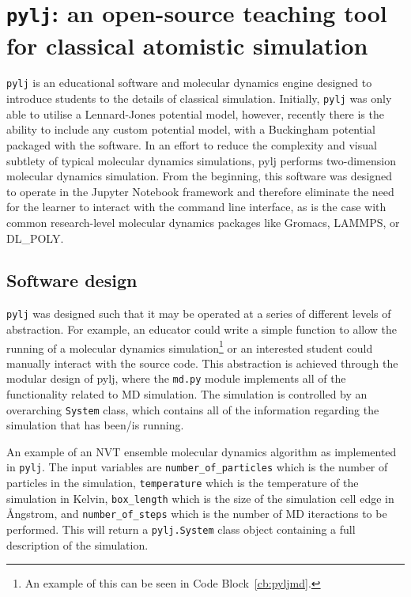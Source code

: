 \section{\texttt{pylj}: an open-source teaching tool for classical atomistic simulation}

\texttt{pylj}\autocite[PYthon Lennard-Jones]{mccluskey_pylj_2018,mccluskey_arm61/pylj_2019-2} is an educational software and molecular dynamics engine designed to introduce students to the details of classical simulation.
Initially, \texttt{pylj} was only able to utilise a Lennard-Jones potential model,\autocite{lennard-jones_determination_1924} however, recently\autocite{mccluskey_arm61/pylj_2018} there is the ability to include any custom potential model, with a Buckingham potential packaged with the software.\autocite{buckingham_classical_1938}
In an effort to reduce the complexity and visual subtlety of typical molecular dynamics simulations, pylj performs two-dimension molecular dynamics simulation.
From the beginning, this software was designed to operate in the Jupyter Notebook framework and therefore eliminate the need for the learner to interact with the command line interface, as is the case with common research-level molecular dynamics packages like Gromacs, LAMMPS, or DL\_POLY.\autocite{berendsen_gromacs_1995,plimpton_fast_1995,smith_dl_poly_2002}

\subsection{Software design}
\texttt{pylj} was designed such that it may be operated at a series of different levels of abstraction.
For example, an educator could write a simple function to allow the running of a molecular dynamics simulation\footnote{An example of this can be seen in Code Block~\ref{cb:pyljmd}.} or an interested student could manually interact with the source code.
This abstraction is achieved through the modular design of pylj, where the \texttt{md.py} module implements all of the functionality related to MD simulation.
The simulation is controlled by an overarching \texttt{System} class, which contains all of the information regarding the simulation that has been/is running.
%
\begin{listing}
    \centering
    \caption{An example of an NVT ensemble molecular dynamics algorithm as implemented in \texttt{pylj}. The input variables are \texttt{number\_of\_particles} which is the number of particles in the simulation, \texttt{temperature} which is the temperature of the simulation in Kelvin, \texttt{box\_length} which is the size of the simulation cell edge in \AA ngstrom, and \texttt{number\_of\_steps} which is the number of MD iteractions to be performed. This will return a \texttt{pylj.System} class object containing a full description of the simulation.}
    
    \label{cb:pyljmd}
\end{listing}
%

